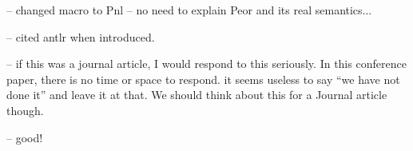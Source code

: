 -- changed \Peor macro to Pnl -- no need to explain Peor and its real
semantics...


-- cited antlr when introduced.


-- if this was a journal article, I would respond to this seriously.  
In this conference paper, there is no time or space to respond.  
it seems useless to say ``we have not done it'' and leave it at that.
We should think about this for a Journal article though.



-- good!


